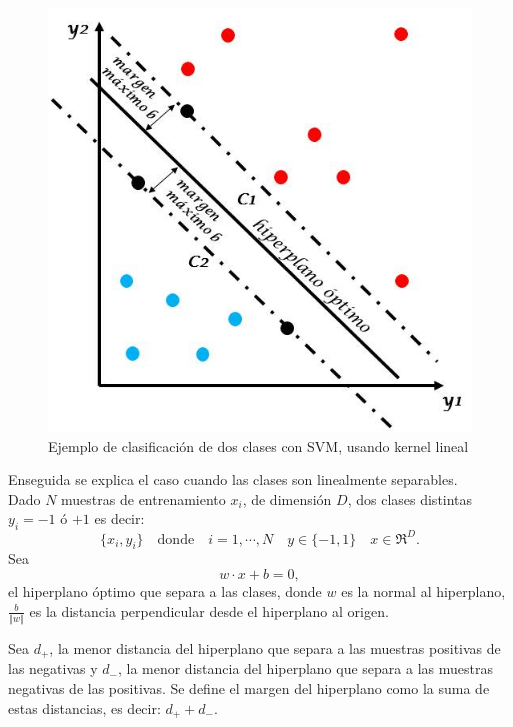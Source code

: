 \begin{figure}[h!]
\begin{center}
\includegraphics[scale=.4]{./Figures/maquinaSoporte.jpg}
\end{center}
\caption{Ejemplo de clasificación de dos clases con SVM, usando kernel lineal}
\label{fig:SVM}
\end{figure} 

Enseguida se explica el caso cuando las clases son linealmente separables.\\
Dado $N$ muestras de entrenamiento $x_i$, de dimensión $D$, dos clases distintas $y_i=-1$ ó $+1$ es decir: 
$$\lbrace x_i,y_i \rbrace \quad \text{donde} \quad  i=1, \cdots ,N \quad y\in \lbrace -1,1 \rbrace \quad x \in \Re^D.$$
Sea  
\begin{equation}\label{eq:hiper}
w \cdot x + b = 0 ,
\end{equation}  
el hiperplano óptimo que separa a las clases, donde $w$ es la normal al hiperplano, $\frac{b}{ \Vert w \Vert}$ es la distancia perpendicular desde el hiperplano al origen.

Sea $d_+$, la menor distancia del hiperplano que separa a las muestras positivas de las negativas y $d_-$, la menor distancia del hiperplano que separa a las muestras negativas de las positivas. Se define el margen del hiperplano como la suma de estas distancias, es decir: $d_+ + d_-$.

